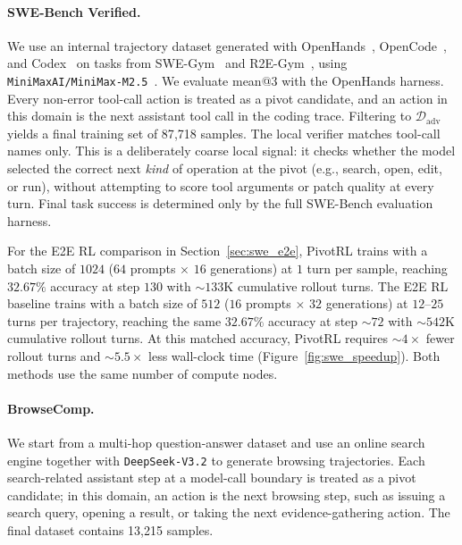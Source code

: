 \paragraph{SWE-Bench Verified.}
We use an internal trajectory dataset generated with OpenHands~\citep{wang2025openhandsopenplatformai}, OpenCode~\citep{opencode}, and Codex~\citep{openaicodex_software} on tasks from SWE-Gym~\citep{pan2025trainingsoftwareengineeringagents} and R2E-Gym~\citep{jain2025r2egymproceduralenvironmentshybrid}, using \texttt{MiniMaxAI/MiniMax-M2.5}~\citep{minimax2026m25}. We evaluate mean@3 with the OpenHands harness. Every non-error tool-call action is treated as a pivot candidate, and an action in this domain is the next assistant tool call in the coding trace. Filtering to $\mathcal{D}_{\mathrm{adv}}$ yields a final training set of 87{,}718 samples. The local verifier matches tool-call names only. This is a deliberately coarse local signal: it checks whether the model selected the correct next \emph{kind} of operation at the pivot (e.g., search, open, edit, or run), without attempting to score tool arguments or patch quality at every turn. Final task success is determined only by the full SWE-Bench evaluation harness.

For the E2E RL comparison in Section~\ref{sec:swe_e2e}, PivotRL trains with a batch size of $1024$ ($64$ prompts $\times$ $16$ generations) at $1$ turn per sample, reaching $32.67\%$ accuracy at step $130$ with ${\sim}133$K cumulative rollout turns. The E2E RL baseline trains with a batch size of $512$ ($16$ prompts $\times$ $32$ generations) at $12$--$25$ turns per trajectory, reaching the same $32.67\%$ accuracy at step ${\sim}72$ with ${\sim}542$K cumulative rollout turns. At this matched accuracy, PivotRL requires ${\sim}4\times$ fewer rollout turns and ${\sim}5.5\times$ less wall-clock time (Figure~\ref{fig:swe_speedup}). Both methods use the same number of compute nodes.

\paragraph{BrowseComp.}
We start from a multi-hop question-answer dataset and use an online search engine together with \texttt{DeepSeek-V3.2} to generate browsing trajectories. Each search-related assistant step at a model-call boundary is treated as a pivot candidate; in this domain, an action is the next browsing step, such as issuing a search query, opening a result, or taking the next evidence-gathering action. The final dataset contains 13{,}215 samples.

